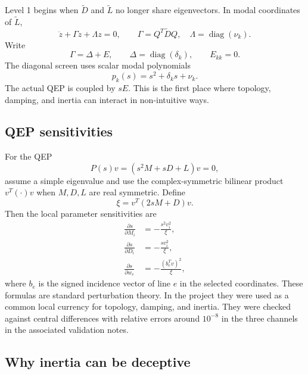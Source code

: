 \documentclass[11pt]{article}
\newcommand{\diag}{\operatorname{diag}}
\newcommand{\Lt}{\widetilde L}
\newcommand{\Dt}{\widetilde D}
\begin{document}
Level 1 begins when $\Dt$ and $\Lt$ no longer share eigenvectors. In modal
coordinates of $\Lt$,
\begin{equation}
  \ddot z+\Gamma\dot z+\Lambda z=0,\qquad
  \Gamma=Q^T\Dt Q,\quad \Lambda=\diag(\nu_k).
  \label{eq:level1-modal}
\end{equation}
Write
\begin{equation}
  \Gamma=\Delta+E,\qquad \Delta=\diag(\delta_k),\qquad E_{kk}=0.
  \label{eq:level1-offdiag}
\end{equation}
The diagonal screen uses scalar modal polynomials
\begin{equation}
  p_k(s)=s^2+\delta_ks+\nu_k.
  \label{eq:scalar-modal-polynomial}
\end{equation}
The actual QEP is coupled by $sE$. This is the first place where topology,
damping, and inertia can interact in non-intuitive ways.

\subsection{QEP sensitivities}

For the QEP
\begin{equation}
  P(s)v=(s^2M+sD+L)v=0,
  \label{eq:qep-general}
\end{equation}
assume a simple eigenvalue and use the complex-symmetric bilinear product
$v^T(\cdot)v$ when $M,D,L$ are real symmetric. Define
\begin{equation}
  \xi=v^T(2sM+D)v.
  \label{eq:qep-xi}
\end{equation}
Then the local parameter sensitivities are
\begin{align}
  \frac{\partial s}{\partial M_i}
  &= -\frac{s^2 v_i^2}{\xi}, \label{eq:qep-sens-M}\\
  \frac{\partial s}{\partial D_i}
  &= -\frac{s v_i^2}{\xi}, \label{eq:qep-sens-D}\\
  \frac{\partial s}{\partial w_e}
  &= -\frac{(b_e^Tv)^2}{\xi}, \label{eq:qep-sens-w}
\end{align}
where $b_e$ is the signed incidence vector of line $e$ in the selected
coordinates. These formulas are standard perturbation theory. In the project
they were used as a common local currency for topology, damping, and inertia.
They were checked against central differences with relative errors around
$10^{-8}$ in the three channels in the associated validation notes.

\subsection{Why inertia can be deceptive}
\end{document}
